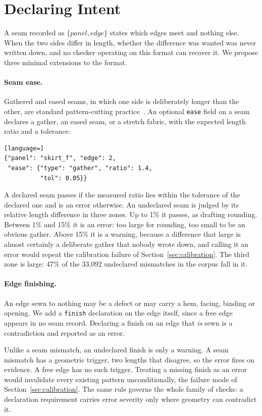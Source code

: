 \documentclass[10pt,twocolumn]{article}
\newcommand{\code}[1]{\texttt{\small #1}}
\begin{document}
\section{Declaring Intent}
\label{sec:intent}

A seam recorded as $\{\textit{panel}, \textit{edge}\}$ states which edges meet
and nothing else. When the two sides differ in length, whether the difference
was wanted was never written down, and no checker operating on this format can
recover it. We propose three minimal extensions to the format.

\paragraph{Seam ease.} Gathered and eased seams, in which one side is
deliberately longer than the other, are standard pattern-cutting
practice~\citep{aldrich2015}. An optional \code{ease} field on a seam declares
a gather, an eased seam, or a stretch fabric, with the expected length ratio
and a tolerance:

\begin{lstlisting}[language=]
{"panel": "skirt_f", "edge": 2,
 "ease": {"type": "gather", "ratio": 1.4,
          "tol": 0.05}}
\end{lstlisting}

\noindent
A declared seam passes if the measured ratio lies within the tolerance of the
declared one and is an error otherwise. An undeclared seam is judged by its
relative length difference in three zones. Up to 1\% it passes, as drafting
rounding. Between 1\% and 15\% it is an error: too large for rounding, too
small to be an obvious gather. Above 15\% it is a warning, because a
difference that large is almost certainly a deliberate gather that nobody
wrote down, and calling it an error would repeat the calibration failure of
Section~\ref{sec:calibration}. The third zone is large: 47\% of the
33{,}092 undeclared mismatches in the corpus fall in it.

\paragraph{Edge finishing.} An edge sewn to nothing may be a defect or may
carry a hem, facing, binding or opening. We add a \code{finish} declaration on
the edge itself, since a free edge appears in no seam record. Declaring a
finish on an edge that \emph{is} sewn is a contradiction and reported as an
error.

Unlike a seam mismatch, an undeclared finish is only a warning. A seam mismatch
has a geometric trigger, two lengths that disagree, so the error fires on
evidence. A free edge has no such trigger. Treating a missing finish as an
error would invalidate every existing pattern unconditionally, the failure mode
of Section~\ref{sec:calibration}. The same rule governs the whole family of
checks: a declaration requirement carries error severity only where geometry
can contradict it.
\end{document}
